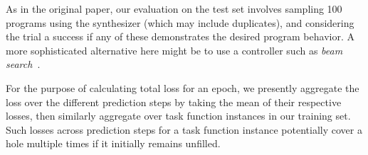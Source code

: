 \documentclass{article}
\begin{document}
As in the original paper,
our evaluation on the test set involves sampling 100 programs using the synthesizer (which may include duplicates),
and considering the trial a success if any of these demonstrates the desired program behavior.
A more sophisticated alternative here might be to use a controller such as \emph{beam search}~\citep{polosukhin2018neural}.


For the purpose of calculating total loss for an epoch,
we presently aggregate the loss over the different
prediction steps by taking the mean of their respective losses,
then similarly aggregate over task function instances in our training set.
Such losses across prediction steps for a task function instance
potentially cover a hole multiple times if it initially remains unfilled.




\end{document}
